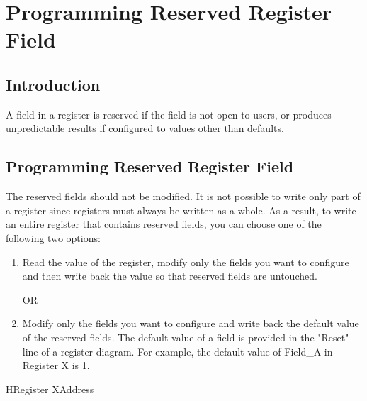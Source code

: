 \chapter*{Programming Reserved Register Field}\label{programming-reserved-field}

\section*{Introduction}

A field in a register is reserved if the field is not open to users, or produces unpredictable results if configured to values other than defaults.

\section*{Programming Reserved Register Field}

The reserved fields should not be modified. It is not possible to write only part of a register since registers must always be written as a whole. As a result, to write an entire register that contains reserved fields, you can choose one of the following two options:

\begin{enumerate}
    \item Read the value of the register, modify only the fields you want to configure and then write back the value so that reserved fields are untouched.

\noindent OR

\item Modify only the fields you want to configure and write back the default value of the reserved fields. The default value of a field is provided in the "Reset" line of a register diagram. For example, the default value of Field\_A in \hyperref[fig:registerX]{Register X} is 1.
\end{enumerate}

\begin{register}{H}{Register X}{Address}\label{fig:registerX}
%
%
%
%
%
\regnewline%

\end{register}

